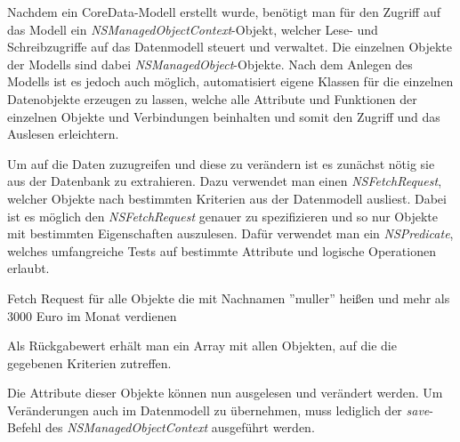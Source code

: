 Nachdem ein CoreData-Modell erstellt wurde, benötigt man für den Zugriff auf das Modell ein \emph{NSManagedObjectContext}-Objekt, welcher Lese- und Schreibzugriffe auf das Datenmodell steuert und verwaltet.
Die einzelnen Objekte der Modells sind dabei \emph{NSManagedObject}-Objekte. Nach dem Anlegen des Modells ist es jedoch auch möglich, automatisiert eigene Klassen für die einzelnen Datenobjekte erzeugen zu lassen, welche alle Attribute und Funktionen der einzelnen Objekte und Verbindungen beinhalten und somit den Zugriff und das Auslesen erleichtern.

Um auf die Daten zuzugreifen und diese zu verändern ist es zunächst nötig sie aus der Datenbank zu extrahieren. Dazu verwendet man einen \emph{NSFetchRequest}, welcher Objekte nach bestimmten Kriterien aus der Datenmodell ausliest.
Dabei ist es möglich den \emph{NSFetchRequest} genauer zu spezifizieren und so nur Objekte mit bestimmten Eigenschaften auszulesen.
Dafür verwendet man ein \emph{NSPredicate}, welches umfangreiche Tests auf bestimmte Attribute und logische Operationen erlaubt.

\begin{listing}[htb! breaklines=true]
    \caption{Fetch Request für alle Objekte die mit Nachnamen ''muller'' heißen und mehr als 3000 Euro im Monat verdienen}
	\label{lst:NSFetchRequest_objc}
\end{listing}

Als Rückgabewert erhält man ein Array mit allen Objekten, auf die die gegebenen Kriterien zutreffen.

Die Attribute dieser Objekte können nun ausgelesen und verändert werden. Um Veränderungen auch im Datenmodell zu übernehmen, muss lediglich der \emph{save}-Befehl des \emph{NSManagedObjectContext} ausgeführt werden.
